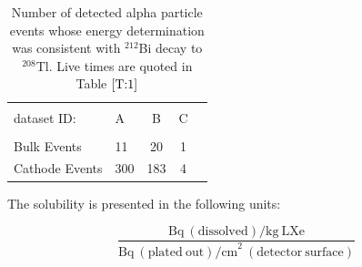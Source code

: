 \begin{table}[ht]
\centering
\caption{Number of detected alpha particle events whose energy determination was consistent with $^{212}$Bi decay to $^{208}$Tl. Live times are quoted in Table $\ref{T:1}$}
\begin{tabular}{llccc}
\hline
\\[-2pt]
dataset ID: & A &B & C \\
\\[-2pt]
\hline
Bulk Events & 11 & 20 & 1 \\
Cathode Events & 300 & 183 & 4 \\
\hline
\end{tabular}
\label{T:3}
\end{table}



The solubility is presented in the following units:


\begin{equation}
\frac{   \mathrm{Bq~(dissolved)/ kg~LXe} }{ \mathrm{Bq~(plated~out) / cm}^{2}~\mathrm{(detector~surface)} }
\end{equation}



